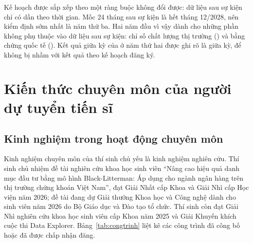 Kế hoạch được sắp xếp theo một ràng buộc không đổi được: dữ liệu sau sự kiện chỉ có dần theo thời gian. Mốc 24 tháng sau sự kiện là hết tháng 12/2028, nên kiểm định  sớm nhất là năm thứ ba. Hai năm đầu vì vậy dành cho những phần không phụ thuộc vào dữ liệu sau sự kiện: chỉ số chất lượng thị trường () và bằng chứng quốc tế (). Kết quả giữa kỳ của  ở năm thứ hai được ghi rõ là giữa kỳ, để không bị nhầm với kết quả theo kế hoạch đăng ký.

\chapter{Kiến thức chuyên môn của người dự tuyển tiến sĩ}\label{ch:8}

\section{Kinh nghiệm trong hoạt động chuyên môn}

Kinh nghiệm chuyên môn của thí sinh chủ yếu là kinh nghiệm nghiên cứu. Thí sinh chủ nhiệm đề tài nghiên cứu khoa học sinh viên \enquote{Nâng cao hiệu quả danh mục đầu tư bằng mô hình Black-Litterman: Áp dụng cho ngành ngân hàng trên thị trường chứng khoán Việt Nam}, đạt Giải Nhất cấp Khoa và Giải Nhì cấp Học viện năm 2026; đề tài đang dự Giải thưởng Khoa học và Công nghệ dành cho sinh viên năm 2026 do Bộ Giáo dục và Đào tạo tổ chức. Thí sinh còn đạt Giải Nhì nghiên cứu khoa học sinh viên cấp Khoa năm 2025 và Giải Khuyến khích cuộc thi Data Explorer. Bảng~\ref{tab:congtrinh} liệt kê các công trình đã công bố hoặc đã được chấp nhận đăng.

